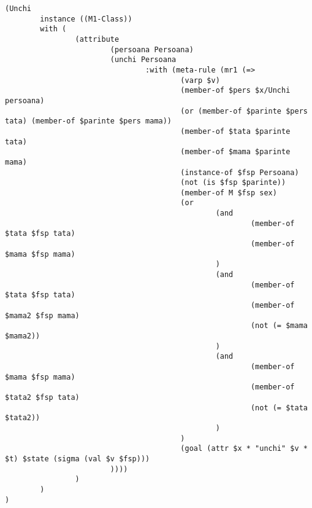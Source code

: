 \documentclass{article}
\begin{document}
{\begin{verbatim}
(Unchi
        instance ((M1-Class))
        with (
                (attribute
                        (persoana Persoana)
                        (unchi Persoana
                                :with (meta-rule (mr1 (=>
                                        (varp $v)
                                        (member-of $pers $x/Unchi persoana)
                                        (or (member-of $parinte $pers tata) (member-of $parinte $pers mama))
                                        (member-of $tata $parinte tata)
                                        (member-of $mama $parinte mama)
                                        (instance-of $fsp Persoana)
                                        (not (is $fsp $parinte))
                                        (member-of M $fsp sex)
                                        (or
                                                (and
                                                        (member-of $tata $fsp tata)
                                                        (member-of $mama $fsp mama)
                                                )
                                                (and
                                                        (member-of $tata $fsp tata)
                                                        (member-of $mama2 $fsp mama)
                                                        (not (= $mama $mama2))
                                                )
                                                (and
                                                        (member-of $mama $fsp mama)
                                                        (member-of $tata2 $fsp tata)
                                                        (not (= $tata $tata2))
                                                )
                                        )
                                        (goal (attr $x * "unchi" $v * $t) $state (sigma (val $v $fsp)))
                        ))))
                )
        )
)


\end{verbatim}}
\end{document}
